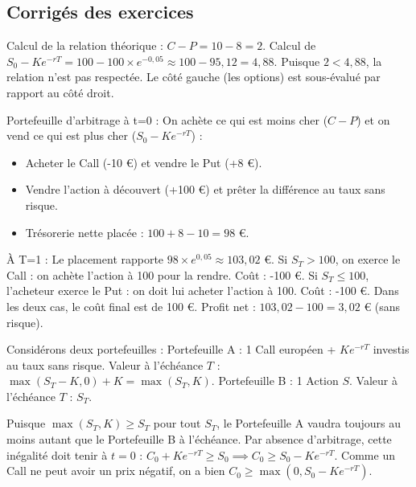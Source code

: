 \subsection{Corrigés des exercices}

\begin{correctionbox}
Calcul de la relation théorique : $C - P = 10 - 8 = 2$.
Calcul de $S_0 - K e^{-rT} = 100 - 100 \times e^{-0,05} \approx 100 - 95,12 = 4,88$.
Puisque $2 < 4,88$, la relation n'est pas respectée. Le côté gauche (les options) est sous-évalué par rapport au côté droit.

Portefeuille d'arbitrage à t=0 :
On achète ce qui est moins cher ($C - P$) et on vend ce qui est plus cher ($S_0 - K e^{-rT}$) :
\begin{itemize}[label=$\cdot$]
    \item Acheter le Call (-10 €) et vendre le Put (+8 €).
    \item Vendre l'action à découvert (+100 €) et prêter la différence au taux sans risque.
    \item Trésorerie nette placée : $100 + 8 - 10 = 98$ €.
\end{itemize}
À T=1 :
Le placement rapporte $98 \times e^{0,05} \approx 103,02$ €.
Si $S_T > 100$, on exerce le Call : on achète l'action à 100 pour la rendre. Coût : -100 €.
Si $S_T \le 100$, l'acheteur exerce le Put : on doit lui acheter l'action à 100. Coût : -100 €.
Dans les deux cas, le coût final est de 100 €.
Profit net : $103,02 - 100 = 3,02$ € (sans risque).
\end{correctionbox}

\begin{correctionbox}
Considérons deux portefeuilles :
Portefeuille A : 1 Call européen + $K e^{-rT}$ investis au taux sans risque.
Valeur à l'échéance $T$ : $\max(S_T - K, 0) + K = \max(S_T, K)$.
Portefeuille B : 1 Action $S$.
Valeur à l'échéance $T$ : $S_T$.

Puisque $\max(S_T, K) \geq S_T$ pour tout $S_T$, le Portefeuille A vaudra toujours au moins autant que le Portefeuille B à l'échéance. Par absence d'arbitrage, cette inégalité doit tenir à $t=0$ :
$C_0 + K e^{-rT} \geq S_0 \implies C_0 \geq S_0 - K e^{-rT}$.
Comme un Call ne peut avoir un prix négatif, on a bien $C_0 \geq \max(0, S_0 - K e^{-rT})$.
\end{correctionbox}

